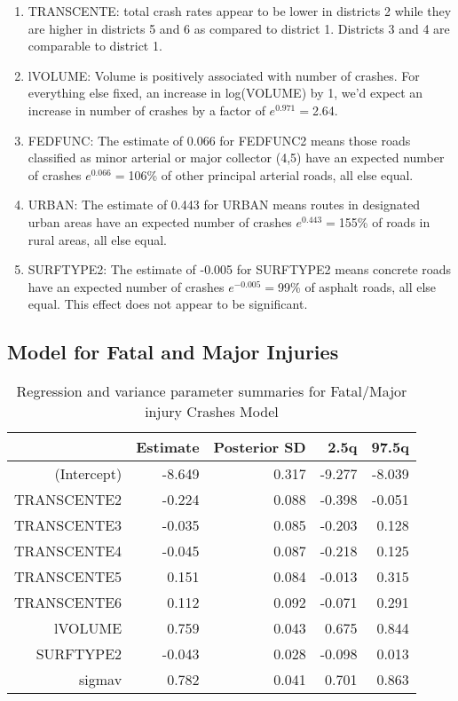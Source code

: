 \documentclass[a4paper]{article}\usepackage[]{graphicx}\usepackage[]{color}
\begin{document}
\begin{enumerate}
\item
TRANSCENTE: total crash rates appear to be lower in districts 2 while they are higher in districts 5 and 6 as compared to district 1. Districts 3 and 4 are comparable to district 1. 

\item
lVOLUME: Volume is positively associated with number of crashes. For everything else fixed, an increase in log(VOLUME) by 1, we'd expect an increase in number of crashes by a factor of $e^{0.971}=$2.64.

\item
FEDFUNC: The estimate of 0.066 for FEDFUNC2 means those roads classified as minor arterial or major collector (4,5) have an expected number of crashes $e^{0.066}=$106\% of other principal arterial roads, all else equal. 


\item
URBAN: The estimate of 0.443 for URBAN means routes in designated urban areas have an expected number of crashes $e^{0.443}=$155\% of roads in rural areas, all else equal.

\item
SURFTYPE2: The estimate of -0.005 for SURFTYPE2 means concrete roads have an expected number of crashes $e^{-0.005}=$99\% of asphalt roads, all else equal. This effect does not appear to be significant.

\end{enumerate}

\clearpage
\subsection{Model for Fatal and Major Injuries}


\begin{table}[ht]
\centering
\begin{tabular}{rrrrr}
  \hline
 & Estimate & Posterior SD & 2.5q & 97.5q \\ 
  \hline
(Intercept) & -8.649 & 0.317 & -9.277 & -8.039 \\ 
  TRANSCENTE2 & -0.224 & 0.088 & -0.398 & -0.051 \\ 
  TRANSCENTE3 & -0.035 & 0.085 & -0.203 & 0.128 \\ 
  TRANSCENTE4 & -0.045 & 0.087 & -0.218 & 0.125 \\ 
  TRANSCENTE5 & 0.151 & 0.084 & -0.013 & 0.315 \\ 
  TRANSCENTE6 & 0.112 & 0.092 & -0.071 & 0.291 \\ 
  lVOLUME & 0.759 & 0.043 & 0.675 & 0.844 \\ 
  SURFTYPE2 & -0.043 & 0.028 & -0.098 & 0.013 \\ 
  sigmav & 0.782 & 0.041 & 0.701 & 0.863 \\ 
   \hline
\end{tabular}
\caption{Regression and variance parameter summaries for Fatal/Major injury Crashes Model} 
\label{fatmajcrash}
\end{table}
\end{document}
